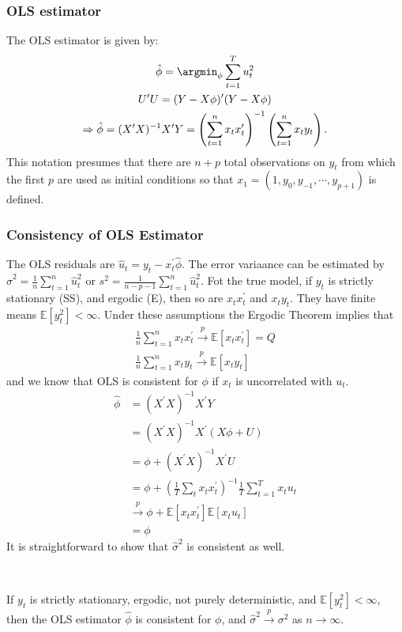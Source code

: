 \subsubsection{OLS estimator}\label{AR-OLS}

The OLS estimator is given by:
\begin{gather*}
    \hat{\phi} = \argmin_{\phi} \sum_{t=1}^{T} u_t^2 \\
    U^{\prime} U = (Y - X\phi)^{\prime} (Y - X\phi) \\
    \Rightarrow \hat{\phi} = (X^{\prime} X)^{-1} X^{\prime} Y = \left( \sum_{t=1}^{n} x_t x_t^{\prime} \right)^{-1} \left( \sum_{t=1}^{n} x_t y_t \right).
\end{gather*}
This notation presumes that there are $n+p$ total observations on $y_t$ from which the first $p$ are used as initial conditions so that
$x_1 = \left( 1, y_0, y_{-1}, \cdots, y_{p+1} \right)$ is defined.

\subsubsection{Consistency of OLS Estimator}\label{sec:consistency-AR-OLS}

The OLS residuals are $\hat{u}_t = y_t - x_t^{\prime} \hat{\phi}$.
The error variaance can be estimated by $\hat{\sigma}^2 = \frac{1}{n} \sum_{t=1}^{n} \hat{u}_t^2$
or $s^2 = \frac{1}{n-p-1} \sum_{t=1}^{n} \hat{u}_t^2.$
Fot the true model, if $y_t$ is strictly stationary (SS), and ergodic (E), then so are $x_t x_t^{\prime} $ and $x_t y_t$.
They have finite means $\mathbb{E}[y_t^2] < \infty.$
Under these assumptions the Ergodic Theorem implies that
\begin{gather*}
    \frac{1}{n} \sum_{t=1}^{n} x_t x_t^{\prime} \overset{p}{\rightarrow} \mathbb{E}[x_t x_t^{\prime}] = Q \\
    \frac{1}{n} \sum_{t=1}^{n} x_t y_t \overset{p}{\rightarrow} \mathbb{E}[x_t y_t]
\end{gather*}
and we know that OLS is consistent for $\phi$ if $x_t$ is uncorrelated with $u_t$.
\begin{align*}
    \hat{\phi} &= (X^{\prime} X)^{-1} X^{\prime} Y \\
    &= (X^{\prime} X)^{-1} X^{\prime} (X\phi + U) \\
    &= \phi + (X^{\prime} X)^{-1} X^{\prime} U \\
    &= \phi + \left( \frac{1}{T} \sum_{t} x_t x_t^{\prime} \right)^{-1} \frac{1}{T} \sum_{t=1}^{T} x_t u_t \\
    & \overset{p}{\rightarrow} \phi + \mathbb{E}[x_t x_t^{\prime}] \mathbb{E}[x_t u_t] \\
    &= \phi
\end{align*}
It is straightforward to show that $\hat{\sigma}^2$ is consistent as well.
\begin{theorem}
    \

    If $y_t$ is strictly stationary, ergodic, not purely deterministic, and $\mathbb{E}[y_t^2] < \infty$,
    then the OLS estimator $\hat{\phi}$ is consistent for $\phi$, and $\hat{\sigma}^2 \overset{p}{\rightarrow} \sigma^2$ as $n \to \infty.$
\end{theorem}

